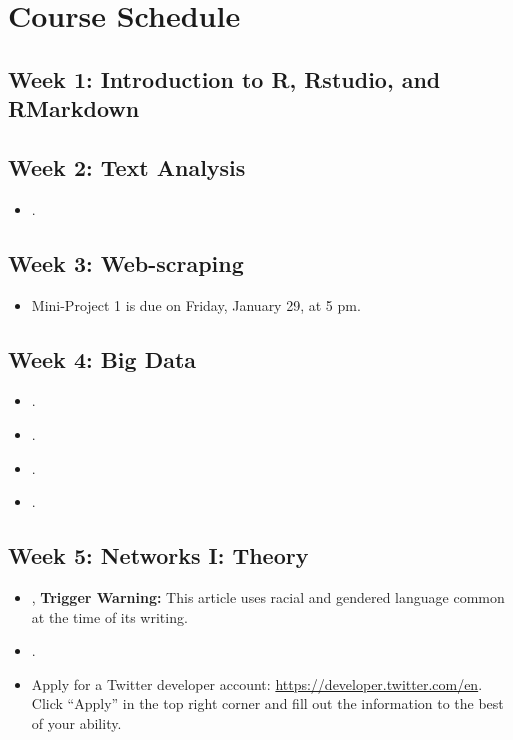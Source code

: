\documentclass[12pt]{article}
\begin{document}
\section*{Course Schedule}

\subsection*{Week 1: Introduction to R, Rstudio, and RMarkdown}

\subsection*{Week 2: Text Analysis}
	\begin{itemize}
	\item {}.
	\end{itemize}
\subsection*{Week 3: Web-scraping}
\begin{itemize}
	\item Mini-Project 1 is due on Friday, January 29, at 5 pm.
		\end{itemize}

\subsection*{Week 4: Big Data}
\begin{itemize}
\item {}.
\item {}.
\item {}.
\item {}.
	\end{itemize}
\subsection*{Week 5: Networks I: Theory}
\begin{itemize}
	\item {}, \textbf{Trigger Warning:} This article uses racial and gendered language common at the time of its writing.
	\item {}.
	\item Apply for a Twitter developer account: \url{https://developer.twitter.com/en}. Click ``Apply'' in the top right corner and fill out the information to the best of your ability. 
	\end{itemize}
\end{document}

